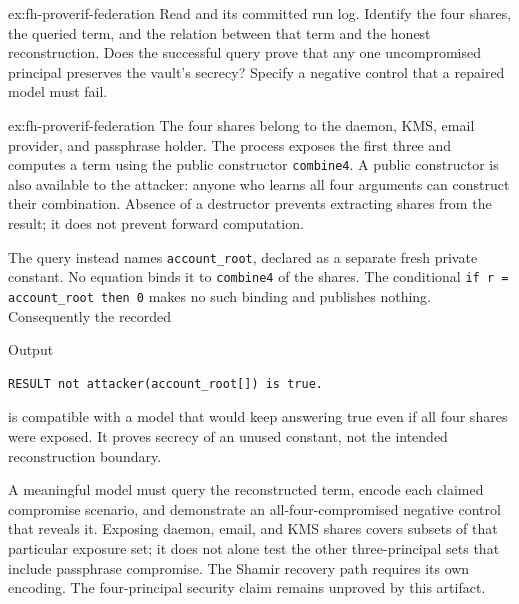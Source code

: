 \documentclass[11pt,a4paper]{article}
\theoremstyle{definition}
\theoremstyle{remark}
\begin{document}
\begin{pdexercise}[kind=Trace,rating=2]{ex:fh-proverif-federation}
Read  and its committed run log. Identify the four shares, the queried term, and the relation between that term and the honest reconstruction. Does the successful query prove that any one uncompromised principal preserves the vault's secrecy? Specify a negative control that a repaired model must fail.
\end{pdexercise}
\begin{pdsolution}{ex:fh-proverif-federation}
The four shares belong to the daemon, KMS, email provider, and passphrase holder. The process exposes the first three and computes a term using the public constructor \texttt{combine4}. A public constructor is also available to the attacker: anyone who learns all four arguments can construct their combination. Absence of a destructor prevents extracting shares from the result; it does not prevent forward computation.

The query instead names \texttt{account\_root}, declared as a separate fresh private constant. No equation binds it to \texttt{combine4} of the shares. The conditional \texttt{if r = account\_root then 0} makes no such binding and publishes nothing. Consequently the recorded
\begin{pdlisting}{Output}{}
\begin{lstlisting}[style=pdoutput]
RESULT not attacker(account_root[]) is true.
\end{lstlisting}
\end{pdlisting}
is compatible with a model that would keep answering true even if all four shares were exposed. It proves secrecy of an unused constant, not the intended reconstruction boundary.

A meaningful model must query the reconstructed term, encode each claimed compromise scenario, and demonstrate an all-four-compromised negative control that reveals it. Exposing daemon, email, and KMS shares covers subsets of that particular exposure set; it does not alone test the other three-principal sets that include passphrase compromise. The Shamir recovery path requires its own encoding. The four-principal security claim remains unproved by this artifact.
\end{pdsolution}

\end{document}
